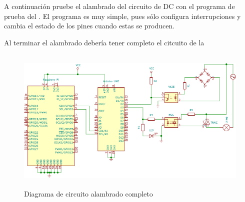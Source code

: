 \medskip

A continuación pruebe el alambrado del circuito de DC con el programa de prueba del .
El programa es muy simple, pues sólo configura interrupciones y cambia el estado de los pines cuando estas se producen.



Al terminar el alambrado debería tener completo el citcuito de la 
\begin{figure}[H]
	\centering
	\includegraphics[width=0.5\columnwidth,height=7cm,keepaspectratio]{img/circuit-full.png}
	\caption{Diagrama de circuito alambrado completo}%
	\label{fig:circuit-full}
\end{figure}
